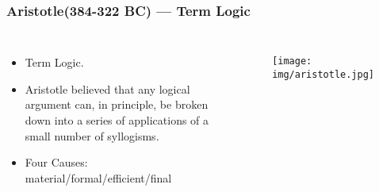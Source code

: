 \documentclass[UTF8,aspectratio=43,11pt,colorlinks,compress,openany]{beamer}%
\begin{document}
\begin{frame}\frametitle{Aristotle(384-322 BC) --- Term Logic}
	\begin{columns}
			\begin{itemize}
				\item Term Logic.
				\item Aristotle believed that any logical argument can, in principle, be broken down into a series of applications of a small number of syllogisms.
				\item Four Causes: material/formal/efficient/final
			\end{itemize}
			\begin{figure}
				\texttt{[image: img/aristotle.jpg]}
			\end{figure}
	\end{columns}
\end{frame}
\end{document}
